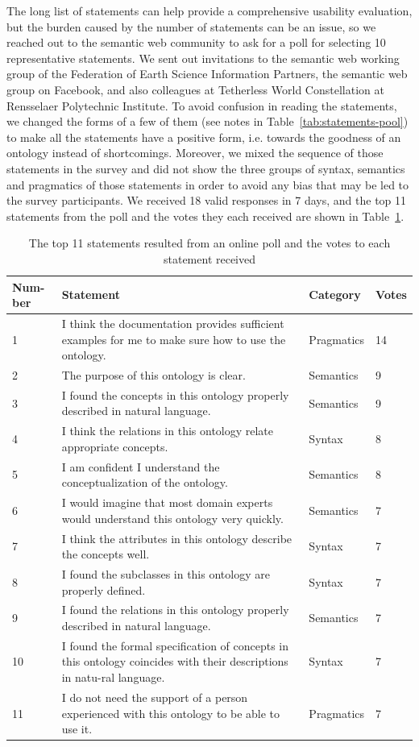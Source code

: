 The long list of statements can help provide a comprehensive usability evaluation, but the burden caused by the number of statements can be an issue, so we reached out to the semantic web community to ask for a poll for selecting 10 representative statements. We sent out invitations to the semantic web working group of the Federation of Earth Science Information Partners, the semantic web group on Facebook, and also colleagues at Tetherless World Constellation at Rensselaer Polytechnic Institute. To avoid confusion in reading the statements, we changed the forms of a few of them (see notes in Table~\ref{tab:statements-pool}) to make all the statements have a positive form, i.e. towards the goodness of an ontology instead of shortcomings. Moreover, we mixed the sequence of those statements in the survey and did not show the three groups of syntax, semantics and pragmatics of those statements in order to avoid any bias that may be led to the survey participants. We received 18 valid responses in 7 days, and the top 11 statements from the poll and the votes they each received are shown in Table~\ref{tab:poll}.
\begin{table}
	\centering
	\caption{The top 11 statements resulted from an online poll and the votes to each statement received}
	\label{tab:poll}
	\begin{tabular}{|p{}|p{}|p{}|p{}|}
		\hline Num-ber & Statement & Category & Votes \\ 
		\hline 1 & I think the documentation provides sufficient examples for me to make sure how to use the ontology. & Pragmatics & 14 \\ 
		\hline 2 & The purpose of this ontology is clear. & Semantics & 9 \\ 
		\hline 3 & I found the concepts in this ontology properly described in natural language. & Semantics & 9 \\ 
		\hline 4 & I think the relations in this ontology relate appropriate concepts. & Syntax & 8 \\ 
		\hline 5 & I am confident I understand the conceptualization of the ontology. & Semantics & 8 \\ 
		\hline 6 & I would imagine that most domain experts would understand this ontology very quickly. & Semantics & 7 \\ 
		\hline 7 & I think the attributes in this ontology describe the concepts well. & Syntax & 7 \\ 
		\hline 8 & I found the subclasses in this ontology are properly defined. & Syntax & 7 \\ 
		\hline 9 & I found the relations in this ontology properly described in natural language. & Semantics & 7 \\ 
		\hline 10 & I found the formal specification of concepts in this ontology coincides with their descriptions in natu-ral language. & Syntax & 7 \\ 
		\hline 11 & I do not need the support of a person experienced with this ontology to be able to use it. & Pragmatics & 7 \\ 
		\hline 
	\end{tabular} 
\end{table}
